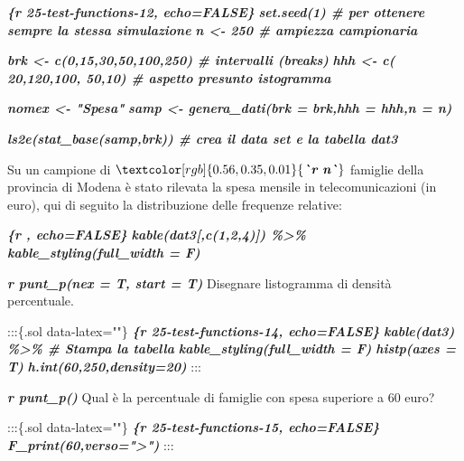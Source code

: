 \documentclass[
  11pt,
]{book}
\newenvironment{Shaded}{\begin{snugshade}}{\end{snugshade}}
\newcommand{\InformationTok}[1]{\textcolor[rgb]{0.56,0.35,0.01}{\textbf{\textit{#1}}}}
\newcommand{\NormalTok}[1]{#1}
\theoremstyle{mytheoremstyle}
\theoremstyle{mydefstyle}
\begin{document}
\begin{Shaded}
\begin{Highlighting}[]
\InformationTok{\textasciigrave{}\textasciigrave{}\textasciigrave{}\{r 25{-}test{-}functions{-}12, echo=FALSE\} }
\InformationTok{set.seed(1)                      \# per ottenere sempre la stessa simulazione}
\InformationTok{n \textless{}{-} 250                         \# ampiezza campionaria}

\InformationTok{brk  \textless{}{-} c(0,15,30,50,100,250)          \# intervalli (breaks)}
\InformationTok{hhh  \textless{}{-} c( 20,120,100, 50,10)       \# aspetto presunto istogramma}

\InformationTok{nomex \textless{}{-} "Spesa"}
\InformationTok{samp \textless{}{-} genera\_dati(brk = brk,hhh = hhh,n = n)}

\InformationTok{ls2e(stat\_base(samp,brk))        \# crea il data set e la tabella dat3}
\InformationTok{\textasciigrave{}\textasciigrave{}\textasciigrave{}}

\NormalTok{Su un campione di $}\InformationTok{\textasciigrave{}r n\textasciigrave{}}\NormalTok{$ famiglie della provincia di Modena è stato }
\NormalTok{rilevata la spesa mensile in telecomunicazioni (in euro), qui di seguito la }
\NormalTok{distribuzione delle frequenze relative:}

\InformationTok{\textasciigrave{}\textasciigrave{}\textasciigrave{}\{r , echo=FALSE\} }
\InformationTok{kable(dat3[,c(1,2,4)]) \%\textgreater{}\%}
\InformationTok{  kable\_styling(full\_width = F)}
\InformationTok{\textasciigrave{}\textasciigrave{}\textasciigrave{}}

\InformationTok{\textasciigrave{}r punt\_p(nex = T, start = T)\textasciigrave{}}\NormalTok{ Disegnare l\textquotesingle{}istogramma di densità }
\NormalTok{percentuale.}

\NormalTok{:::\{.sol data{-}latex=""\}}
\InformationTok{\textasciigrave{}\textasciigrave{}\textasciigrave{}\{r 25{-}test{-}functions{-}14, echo=FALSE\} }
\InformationTok{kable(dat3) \%\textgreater{}\%            \# Stampa la tabella}
\InformationTok{  kable\_styling(full\_width = F)}
\InformationTok{histp(axes = T)}
\InformationTok{h.int(60,250,density=20)}
\InformationTok{\textasciigrave{}\textasciigrave{}\textasciigrave{}}
\NormalTok{:::}

\InformationTok{\textasciigrave{}r punt\_p()\textasciigrave{}}\NormalTok{ Qual è la percentuale di famiglie con }
\NormalTok{spesa superiore a 60 euro?}

\NormalTok{:::\{.sol data{-}latex=""\}}
\InformationTok{\textasciigrave{}\textasciigrave{}\textasciigrave{}\{r 25{-}test{-}functions{-}15, echo=FALSE\} }
\InformationTok{F\_print(60,verso="\textgreater{}")}
\InformationTok{\textasciigrave{}\textasciigrave{}\textasciigrave{}}
\NormalTok{:::}
\end{Highlighting}
\end{Shaded}
\end{document}
